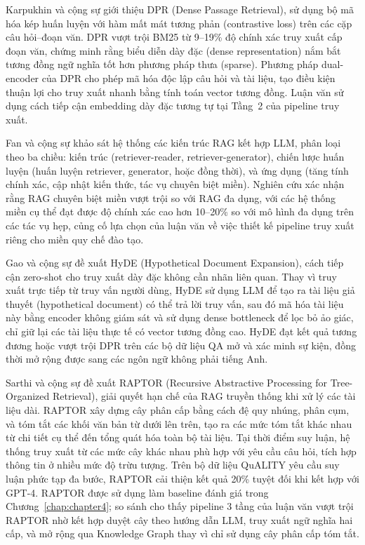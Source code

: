 Karpukhin và cộng sự \cite{karpukhin2020dpr} giới thiệu DPR (Dense Passage
Retrieval), sử dụng bộ mã hóa kép huấn luyện với hàm mất mát tương phản
(contrastive loss) trên các cặp câu hỏi--đoạn văn. DPR vượt trội BM25 từ
9--19\% độ chính xác truy xuất cấp đoạn văn, chứng minh rằng biểu diễn dày đặc
(dense representation) nắm bắt tương đồng ngữ nghĩa tốt hơn phương pháp thưa
(sparse). Phương pháp dual-encoder của DPR cho phép mã hóa độc lập câu hỏi và
tài liệu, tạo điều kiện thuận lợi cho truy xuất nhanh bằng tính toán vector tương
đồng. Luận văn sử dụng cách tiếp cận embedding dày đặc tương tự tại Tầng~2
của pipeline truy xuất.

Fan và cộng sự \cite{fan2024ragsurvey} khảo sát hệ thống các kiến trúc RAG kết
hợp LLM, phân loại theo ba chiều: kiến trúc (retriever-reader, retriever-generator),
chiến lược huấn luyện (huấn luyện retriever, generator, hoặc đồng thời), và ứng
dụng (tăng tính chính xác, cập nhật kiến thức, tác vụ chuyên biệt miền). Nghiên
cứu xác nhận rằng RAG chuyên biệt miền vượt trội so với RAG đa dụng, với các hệ
thống miền cụ thể đạt được độ chính xác cao hơn 10--20\% so với mô hình đa dụng
trên các tác vụ hẹp, củng cố lựa chọn của luận văn về việc thiết kế pipeline truy
xuất riêng cho miền quy chế đào tạo.

Gao và cộng sự \cite{gao2023hyde} đề xuất HyDE (Hypothetical Document Expansion),
cách tiếp cận zero-shot cho truy xuất dày đặc không cần nhãn liên quan. Thay vì
truy xuất trực tiếp từ truy vấn người dùng, HyDE sử dụng LLM để tạo ra tài liệu
giả thuyết (hypothetical document) có thể trả lời truy vấn, sau đó mã hóa tài liệu
này bằng encoder không giám sát và sử dụng dense bottleneck để lọc bỏ ảo giác, chỉ
giữ lại các tài liệu thực tế có vector tương đồng cao. HyDE đạt kết quả tương đương
hoặc vượt trội DPR trên các bộ dữ liệu QA mở và xác minh sự kiện, đồng thời mở
rộng được sang các ngôn ngữ không phải tiếng Anh.

Sarthi và cộng sự \cite{sarthi2024raptor} đề xuất RAPTOR (Recursive Abstractive
Processing for Tree-Organized Retrieval), giải quyết hạn chế của RAG truyền thống
khi xử lý các tài liệu dài. RAPTOR xây dựng cây phân cấp bằng cách đệ quy nhúng,
phân cụm, và tóm tắt các khối văn bản từ dưới lên trên, tạo ra các mức tóm tắt
khác nhau từ chi tiết cụ thể đến tổng quát hóa toàn bộ tài liệu. Tại thời điểm
suy luận, hệ thống truy xuất từ các mức cây khác nhau phù hợp với yêu cầu câu hỏi,
tích hợp thông tin ở nhiều mức độ trừu tượng. Trên bộ dữ liệu QuALITY yêu cầu suy
luận phức tạp đa bước, RAPTOR cải thiện kết quả 20\% tuyệt đối khi kết hợp với
GPT-4. RAPTOR được sử dụng làm baseline đánh giá trong Chương~\ref{chap:chapter4};
so sánh cho thấy pipeline 3 tầng của luận văn vượt trội RAPTOR nhờ kết hợp duyệt
cây theo hướng dẫn LLM, truy xuất ngữ nghĩa hai cấp, và mở rộng qua Knowledge
Graph thay vì chỉ sử dụng cây phân cấp tóm tắt.

